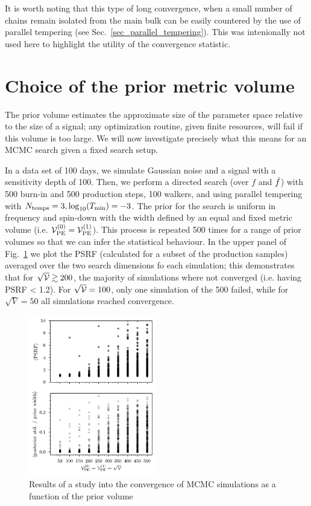 \documentclass[aps, prd, twocolumn, superscriptaddress, floatfix, showpacs, nofootinbib, longbibliography]{revtex4-1}
\begin{document}
It is worth noting that this type of long convergence, when a small number of
chains remain isolated from the main bulk can be easily countered by the use
of parallel tempering (see Sec.~\ref{sec_parallel_tempering}). This was intenionally
not used here to highlight the utility of the convergence statistic.

\section{Choice of the prior metric volume}

The prior volume estimates the approximate size of the parameter space relative
to the size of a signal; any optimization routine, given finite resources,
will fail if this volume is too large. We will now investigate precisely what
this means for an MCMC search given a fixed search setup.

In a data set of 100 days, we simulate Gaussian noise and a signal with a
sensitivity depth of 100. Then, we perform a directed search (over $f$ and
$\dot{f}$) with 500 burn-in and 500 production steps, 100 walkers, and using
parallel tempering with $N_{\rm temps}=3, \log_{10}(T_\textrm{min})=-3$. The prior for the search
is uniform in frequency and spin-down with the width defined by an equal and
fixed metric volume (i.e. $\mathcal{V}_{\rm PE}^{(0)}=\mathcal{V}_{\rm PE}^{(1)}$). This process is repeated
500 times for a range of prior volumes so that we can infer the statistical
behaviour. In the upper panel of Fig.~\ref{fig_volume_convergence} we plot the
PSRF (calculated for a subset of the production samples) averaged over the two
search dimensions fo each simulation; this demonstrates that for $\sqrt{\mathcal{V}}
\gtrsim 200$, the majority of simulations where not converged (i.e. having
PSRF < 1.2). For $\sqrt{\mathcal{V}}=100$, only one simulation of the 500 failed, while
for $\sqrt{V}=50$ all simulations reached convergence.

\begin{figure}[htb]
\centering
\includegraphics[width=0.5\textwidth]{VolumeConvergenceInvestigation}
\caption{Results of a study into the convergence of MCMC simulations as a
function of the prior volume}
\label{fig_volume_convergence}
\end{figure}
\end{document}
